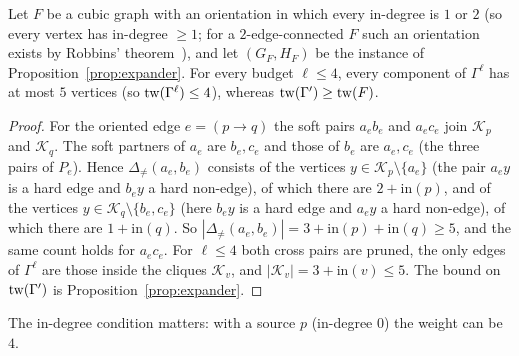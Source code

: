 \begin{proposition}\label{prop:Pstrict}
Let $F$ be a cubic graph with an orientation in which every in-degree is $1$ or $2$ (so every vertex has in-degree $\ge1$; for a $2$-edge-connected $F$ such an orientation exists by Robbins' theorem~\cite{Rob39}), and let $(G_F,H_F)$ be the instance of Proposition~\ref{prop:expander}. For every budget $\ell\le4$, every component of $\Gamma^\ell$ has at most $5$ vertices (so $\mathrm{tw}(\Gamma^\ell)\le4$), whereas $\mathrm{tw}(\Gamma')\ge\mathrm{tw}(F)$.
\end{proposition}
\begin{proof}
For the oriented edge $e=(p\to q)$ the soft pairs $a_eb_e$ and $a_ec_e$ join $\mathcal K_p$ and $\mathcal K_q$. The soft partners of $a_e$ are $b_e,c_e$ and those of $b_e$ are $a_e,c_e$ (the three pairs of $P_e$). Hence $\Delta_{\neq}(a_e,b_e)$ consists of the vertices $y\in \mathcal K_p\setminus\{a_e\}$ (the pair $a_ey$ is a hard edge and $b_ey$ a hard non-edge), of which there are $2+\mathrm{in}(p)$, and of the vertices $y\in \mathcal K_q\setminus\{b_e,c_e\}$ (here $b_ey$ is a hard edge and $a_ey$ a hard non-edge), of which there are $1+\mathrm{in}(q)$. So $|\Delta_{\neq}(a_e,b_e)|=3+\mathrm{in}(p)+\mathrm{in}(q)\ge5$, and the same count holds for $a_ec_e$. For $\ell\le4$ both cross pairs are pruned, the only edges of $\Gamma^\ell$ are those inside the cliques $\mathcal K_v$, and $|\mathcal K_v|=3+\mathrm{in}(v)\le5$. The bound on $\mathrm{tw}(\Gamma')$ is Proposition~\ref{prop:expander}.
\end{proof}
The in-degree condition matters: with a source $p$ (in-degree $0$) the weight can be $4$.

